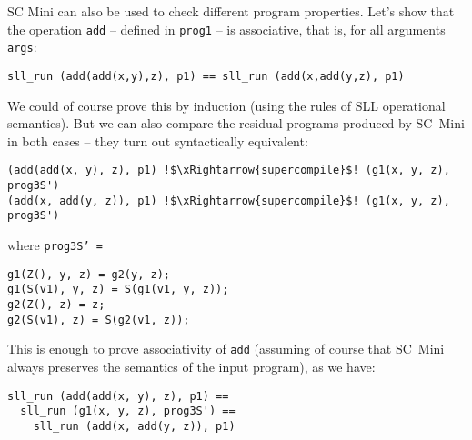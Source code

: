 % 

%

SC Mini can also be used to check different program properties.
Let's show that the operation \texttt{add} -- defined in \texttt{prog1} --
is associative, that is, for all arguments \texttt{args}:
\begin{lstlisting}
sll_run (add(add(x,y),z), p1) == sll_run (add(x,add(y,z), p1)
\end{lstlisting}
We could of course prove this by induction (using the rules of SLL operational semantics).
But we can also compare the residual programs produced by SC~Mini in both cases --
they turn out syntactically equivalent:
\begin{lstlisting}[language=sll,escapechar=!]
(add(add(x, y), z), p1) !$\xRightarrow{supercompile}$! (g1(x, y, z), prog3S')
(add(x, add(y, z)), p1) !$\xRightarrow{supercompile}$! (g1(x, y, z), prog3S')
\end{lstlisting}
where \texttt{prog3S' =}
\begin{lstlisting}[language=sll]
g1(Z(), y, z) = g2(y, z);
g1(S(v1), y, z) = S(g1(v1, y, z));
g2(Z(), z) = z;
g2(S(v1), z) = S(g2(v1, z));
\end{lstlisting}
This is enough to prove associativity of \texttt{add} (assuming of course
that SC~Mini always preserves the semantics of the input program), as we have:
\begin{lstlisting}
sll_run (add(add(x, y), z), p1) ==
  sll_run (g1(x, y, z), prog3S') ==
    sll_run (add(x, add(y, z)), p1)
\end{lstlisting}
